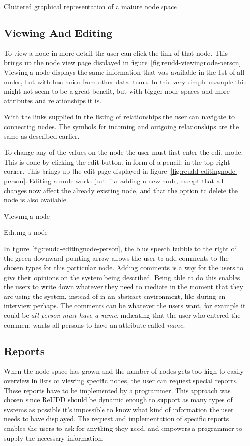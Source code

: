 \documentclass[a4paper]{report}
\begin{document}
	{Cluttered graphical representation of a mature node space}

\subsection{Viewing And Editing}
To view a node in more detail the user can click the link of that node. This brings up the node view page displayed in figure~\ref{fig:reudd-viewingnode-person}. Viewing a node displays the same information that was available in the list of all nodes, but with less noise from other data items. In this very simple example this might not seem to be a great benefit, but with bigger node spaces and more attributes and relationships it is.

With the links supplied in the listing of relationships the user can navigate to connecting nodes. The symbols for incoming and outgoing relationships are the same as described earlier.

To change any of the values on the node the user must first enter the edit mode. This is done by clicking the edit button, in form of a pencil, in the top right corner. This brings up the edit page displayed in figure~\ref{fig:reudd-editingnode-person}. Editing a node works just like adding a new node, except that all changes now affect the already existing node, and that the option to delete the node is also available.

	{Viewing a node}

	{Editing a node}

In figure~\ref{fig:reudd-editingnode-person}, the blue speech bubble to the right of the green downward pointing arrow allows the user to add comments to the chosen types for this particular node. Adding comments is a way for the users to give their opinions on the system being described. Being able to do this enables the users to write down whatever they need to mediate in the moment that they are using the system, instead of in an abstract environment, like during an interview perhaps. The comments can be whatever the users want, for example it could be \emph{all person must have a name}, indicating that the user who entered the comment wants all persons to have an attribute called \emph{name}.

\subsection{Reports} \label{sec:reports-user}
When the node space has grown and the number of nodes gets too high to easily overview in lists or viewing specific nodes, the user can request special reports. These reports have to be implemented by a programmer. This approach was chosen since ReUDD should be dynamic enough to support as many types of systems as possible it's impossible to know what kind of information the user needs to have displayed. The request and implementation of specific reports enables the users to ask for anything they need, and empowers a programmer to supply the necessary information.
\end{document}
